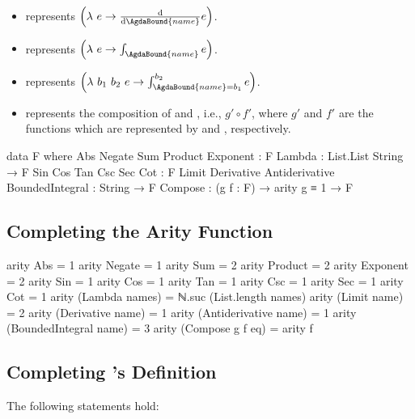 \documentclass{report}
\begin{document}
\begin{itemize}
{    
  }
  \item {}  represents \(\left(\lambda\ e \rightarrow \derivative{\AgdaBound{name}} e\right)\).
  \item {}  represents \(\left(\lambda\ e \rightarrow \int_{\AgdaBound{name}} e\right)\).
  \item {}  represents \(\left(\lambda\ b_1\ b_2\ e \rightarrow \int_{\AgdaBound{name} = b_1}^{b_2} e\right)\).
  \item {}   represents the composition of  and , i.e., \(g' ∘ f'\), where \(g'\) and \(f'\) are the functions which are represented by  and , respectively.
\end{itemize}

\begin{code}
  data F where
    Abs
     Negate
     Sum
     Product
     Exponent : F
    Lambda : List.List String → F
    Sin
     Cos
     Tan
     Csc
     Sec
     Cot : F
    Limit
     Derivative
     Antiderivative
     BoundedIntegral : String → F
    Compose : (g f : F) → arity g ≡ 1 → F
\end{code}

\subsection{Completing the Arity Function}

\begin{code}
  arity Abs = 1
  arity Negate = 1
  arity Sum = 2
  arity Product = 2
  arity Exponent = 2
  arity Sin = 1
  arity Cos = 1
  arity Tan = 1
  arity Csc = 1
  arity Sec = 1
  arity Cot = 1
  arity (Lambda names) = ℕ.suc (List.length names)
  arity (Limit name) = 2
  arity (Derivative name) = 1
  arity (Antiderivative name) = 1
  arity (BoundedIntegral name) = 3
  arity (Compose g f eq) = arity f
\end{code}

\subsection{Completing 's Definition}
The following statements hold:
\end{document}
